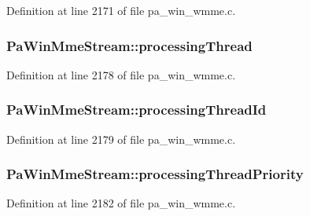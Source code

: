 Definition at line 2171 of file pa\+\_\+win\+\_\+wmme.\+c.

\subsubsection[{\texorpdfstring{processing\+Thread}{processingThread}}]{ Pa\+Win\+Mme\+Stream\+::processing\+Thread}\hypertarget{struct_pa_win_mme_stream_a3c0f314f711da19024f91b314129690c}{}\label{struct_pa_win_mme_stream_a3c0f314f711da19024f91b314129690c}


Definition at line 2178 of file pa\+\_\+win\+\_\+wmme.\+c.

\subsubsection[{\texorpdfstring{processing\+Thread\+Id}{processingThreadId}}]{ Pa\+Win\+Mme\+Stream\+::processing\+Thread\+Id}\hypertarget{struct_pa_win_mme_stream_a02e208a29b618ee4bf251c1fe5b232fe}{}\label{struct_pa_win_mme_stream_a02e208a29b618ee4bf251c1fe5b232fe}


Definition at line 2179 of file pa\+\_\+win\+\_\+wmme.\+c.

\subsubsection[{\texorpdfstring{processing\+Thread\+Priority}{processingThreadPriority}}]{ Pa\+Win\+Mme\+Stream\+::processing\+Thread\+Priority}\hypertarget{struct_pa_win_mme_stream_a311881b80202a1e0e34f1843cef38f80}{}\label{struct_pa_win_mme_stream_a311881b80202a1e0e34f1843cef38f80}


Definition at line 2182 of file pa\+\_\+win\+\_\+wmme.\+c.

